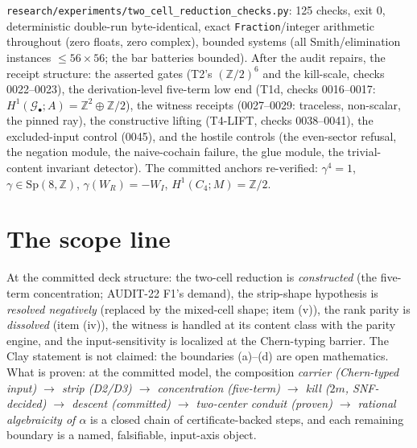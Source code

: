 \documentclass[11pt]{article}
\newcommand{\Cfour}{C_4}
\newcommand{\Gbul}{\mathcal{G}_\bullet}
\newcommand{\Z}{\mathbb{Z}}
\begin{document}
\texttt{research/experiments/two\_cell\_reduction\_checks.py}:
125 checks, exit 0, deterministic double-run byte-identical, exact
\texttt{Fraction}/integer arithmetic throughout (zero floats, zero
complex), bounded systems (all Smith/elimination instances
$\le 56\times 56$; the bar batteries bounded). After the audit
repairs, the receipt structure: the asserted gates (T2's $(\Z/2)^6$
and the kill-scale, checks 0022--0023), the derivation-level
five-term low end (T1d, checks 0016--0017:
$H^1(\Gbul;A)=\Z^2\oplus\Z/2$), the witness receipts (0027--0029:
traceless, non-scalar, the pinned ray), the constructive lifting
(T4-LIFT, checks 0038--0041), the excluded-input control (0045), and
the hostile controls (the even-sector refusal, the negation module,
the naive-cochain failure, the glue module, the trivial-content
invariant detector). The committed anchors re-verified: $\gamma^4=1$,
$\gamma\in\mathrm{Sp}(8,\Z)$, $\gamma(W_R)=-W_I$, $H^1(\Cfour;M)=\Z/2$.

\section{The scope line}

At the committed deck structure: the two-cell reduction is
\emph{constructed} (the five-term concentration; AUDIT-22 F1's demand),
the strip-shape hypothesis is \emph{resolved negatively} (replaced by
the mixed-cell shape; item (v)), the rank parity is \emph{dissolved}
(item (iv)), the witness is handled at its content class with the
parity engine, and the input-sensitivity is localized at the
Chern-typing barrier. The Clay statement is not claimed: the
boundaries (a)--(d) are open mathematics. What is proven: at the
committed model, the composition
\emph{carrier (Chern-typed input) $\to$ strip (D2/D3) $\to$
concentration (five-term) $\to$ kill ($2m$, SNF-decided) $\to$ descent
(committed) $\to$ two-center conduit (proven) $\to$ rational
algebraicity of $\alpha$}
is a closed chain of certificate-backed steps, and each remaining
boundary is a named, falsifiable, input-axis object.
\end{document}
